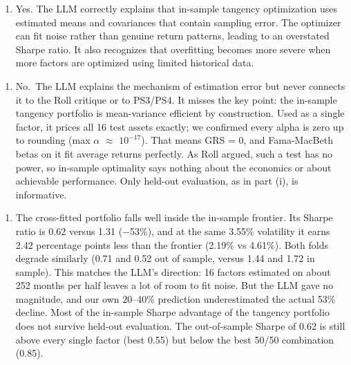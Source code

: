 \documentclass[11pt,letterpaper]{article}
\providecommand{\tightlist}{\setlength{\itemsep}{0pt}\setlength{\parskip}{0pt}}
\begin{document}
\begin{enumerate}
\def\labelenumi{(\roman{enumi})}
\tightlist
\item
  Yes. The LLM correctly explains that in-sample tangency optimization uses estimated means and covariances that contain sampling error. The optimizer can fit noise rather than genuine return patterns, leading to an overstated Sharpe ratio. It also recognizes that overfitting becomes more severe when more factors are optimized using limited historical data.
\end{enumerate}


\begin{enumerate}
\def\labelenumi{(\roman{enumi})}
\setcounter{enumi}{1}
\tightlist
\item
  No.~The LLM explains the mechanism of estimation error but never connects it to the Roll critique or to PS3/PS4. It misses the key point: the in-sample tangency portfolio is mean-variance efficient by construction. Used as a single factor, it prices all 16 test assets exactly; we confirmed every alpha is zero up to rounding (max \textbar \ensuremath{\alpha}\textbar{} \ensuremath{\approx} \(10^{-17}\)). That means GRS = 0, and Fama-MacBeth betas on it fit average returns perfectly. As Roll argued, such a test has no power, so in-sample optimality says nothing about the economics or about achievable performance. Only held-out evaluation, as in part (i), is informative.
\end{enumerate}


\begin{enumerate}
\def\labelenumi{(\roman{enumi})}
\setcounter{enumi}{2}
\tightlist
\item
  The cross-fitted portfolio falls well inside the in-sample frontier. Its Sharpe ratio is 0.62 versus 1.31 (\ensuremath{-}53\%), and at the same 3.55\% volatility it earns 2.42 percentage points less than the frontier (2.19\% vs 4.61\%). Both folds degrade similarly (0.71 and 0.52 out of sample, versus 1.44 and 1.72 in sample). This matches the LLM's direction: 16 factors estimated on about 252 months per half leaves a lot of room to fit noise. But the LLM gave no magnitude, and our own 20--40\% prediction underestimated the actual 53\% decline. Most of the in-sample Sharpe advantage of the tangency portfolio does not survive held-out evaluation. The out-of-sample Sharpe of 0.62 is still above every single factor (best 0.55) but below the best 50/50 combination (0.85).
\end{enumerate}
\end{document}
